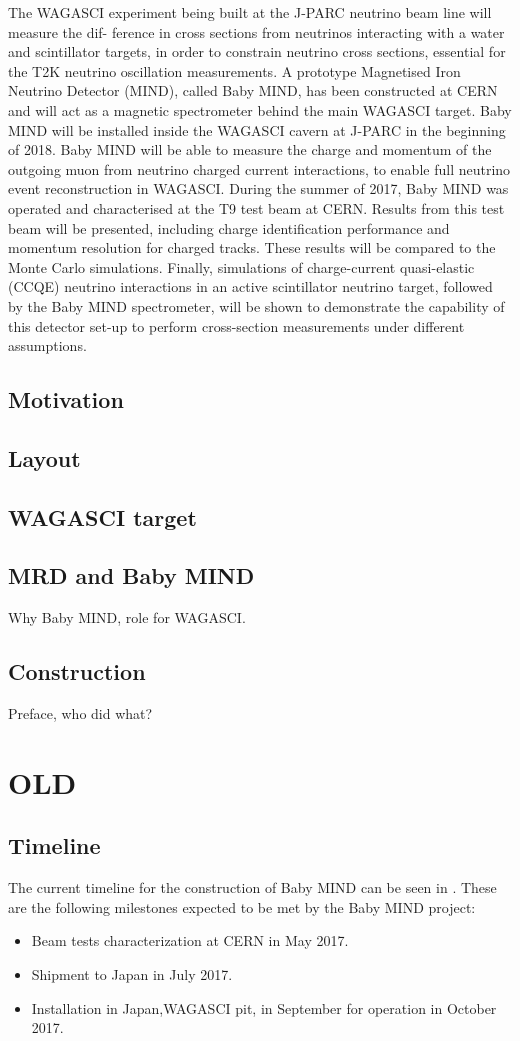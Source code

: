 The WAGASCI experiment being built at the J-PARC neutrino beam line will measure the dif- ference in cross sections from neutrinos interacting with a water and scintillator targets, in order to constrain neutrino cross sections, essential for the T2K neutrino oscillation measurements. A prototype Magnetised Iron Neutrino Detector (MIND), called Baby MIND, has been constructed at CERN and will act as a magnetic spectrometer behind the main WAGASCI target. Baby MIND will be installed inside the WAGASCI cavern at J-PARC in the beginning of 2018. Baby MIND will be able to measure the charge and momentum of the outgoing muon from neutrino charged current interactions, to enable full neutrino event reconstruction in WAGASCI.
During the summer of 2017, Baby MIND was operated and characterised at the T9 test beam at CERN. Results from this test beam will be presented, including charge identification performance and momentum resolution for charged tracks. These results will be compared to the Monte Carlo simulations. Finally, simulations of charge-current quasi-elastic (CCQE) neutrino interactions in an active scintillator neutrino target, followed by the Baby MIND spectrometer, will be shown to demonstrate the capability of this detector set-up to perform cross-section measurements under different assumptions.

\subsection{Motivation}
\subsection{Layout}
\subsection{WAGASCI target}
\subsection{MRD and Baby MIND}
Why Baby MIND, role for WAGASCI.
\subsection{Construction}
Preface, who did what?

\section{OLD}
\subsection{Timeline}
The current timeline for the construction of Baby MIND can be seen in .
These are the following milestones expected to be met by the Baby MIND project:
\begin{itemize}
\item Beam tests characterization at CERN in May 2017.
\item Shipment to Japan in July 2017.
\item Installation in Japan,WAGASCI pit, in September for operation in October 2017.
\end{itemize}


